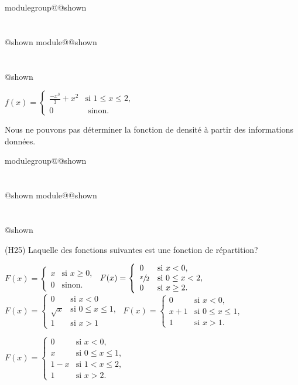 \documentclass{Evaluation}
\makeatletter
\newcommand{\currentmodulekey}{}
\newcommand{\currentmoduletitle}{}
\newcommand{\currentgroupkey}{}
\newcommand{\currentgrouptitle}{}
\newcommand{\showmoduleifneeded}{%
  \ifx\currentgroupkey\empty\else
    \expandafter\ifx\csname modulegroup@\currentgroupkey @shown\endcsname\relax
      \section*{\currentgrouptitle}%
      \expandafter\gdef\csname modulegroup@\currentgroupkey @shown\endcsname{1}%
    \fi
  \fi
  \expandafter\ifx\csname module@\currentmodulekey @shown\endcsname\relax
    \section*{\currentmoduletitle}%
    \expandafter\gdef\csname module@\currentmodulekey @shown\endcsname{1}%
  \fi
}
\newenvironment{H25}{\showmoduleifneeded}{}
\makeatother
\begin{document}
\begin{questions}
\begin{H25}
\begin{checkboxes}
\choice $ f(x) = \left\{
			\begin{array}{ll}
   \displaystyle \frac{-x^3}{3}+x^2& \text{si } 1\leq x\leq 2, \\

			0 &  \mbox{ sinon. }
			\end{array}
			\right. $

      		\vspace{0.3cm}

\choice Nous ne pouvons pas déterminer la fonction de densité à partir des informations données.

\end{checkboxes}

\vspace{0.5cm}
\end{H25}

\begin{H25}
\question
(H25)
Laquelle des fonctions suivantes est une fonction de répartition? 

\begin{checkboxes}
\choice $F(x)=\left\{
			\begin{array}{ll}
			x  & \mbox{si } x \ge 0, \\
			0 & \mbox{sinon.}
			\end{array}
			\right. $
		\vspace{0.3cm}
\choice $ F(x) = \left\{
			\begin{array}{ll}
			0  & \mbox{si } x<0, \\
			\displaystyle \sfrac{x}{2} & \mbox{si } 0\leq x < 2,\\
			0 & \mbox{si } x \geq 2.
			\end{array}
			\right. $
\choice $ F(x) = \left\{
			\begin{array}{ll}
            0 & \mbox{si } x<0\\
			\sqrt{x}  & \mbox{si } 0\leq x\leq 1, \\
			1 & \mbox{si } x>1
			\end{array}
			\right. $
\choice $ F(x) = \left\{
			\begin{array}{ll}
			0  & \mbox{si } x < 0, \\
			x + 1& \mbox{si } 0 \leq x \leq 1,\\
			1 &  \mbox{si } x > 1.
			\end{array}
			\right. $

   \choice $ F(x) = \left\{
			\begin{array}{ll}
			0  & \mbox{si } x < 0, \\
			x & \mbox{si } 0 \leq x \leq 1,\\
                1-x & \mbox{si } 1< x \leq 2,\\ 
			1 &  \mbox{si } x> 2.
			\end{array}
			\right. $
\end{checkboxes}
\end{H25}


\end{questions}
\end{document}
